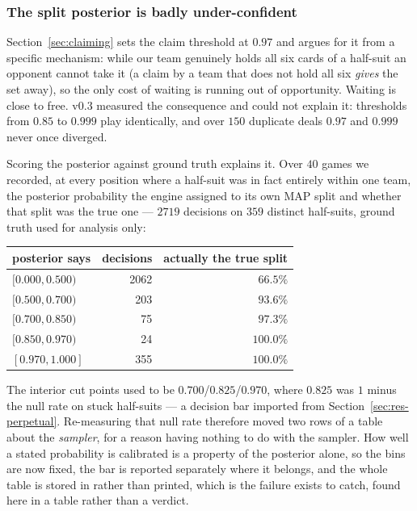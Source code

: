 \documentclass[11pt,letterpaper]{article}
\begin{document}
\subsubsection{The split posterior is badly under-confident}
\label{sec:res-splitcal}

Section~\ref{sec:claiming} sets the claim threshold at $0.97$ and argues for it
from a specific mechanism: while our team genuinely holds all six cards of a
half-suit an opponent cannot take it (a claim by a team that does not hold
all six \emph{gives} the set away), so the only cost of waiting is running out
of opportunity. Waiting is close to free. v0.3 measured the consequence and
could not explain it: thresholds from $0.85$ to $0.999$ play identically, and
over $150$ duplicate deals $0.97$ and $0.999$ never once diverged.

Scoring the posterior against ground truth explains it. Over $40$ games we
recorded, at every position where a half-suit was in fact entirely within one
team, the posterior probability the engine assigned to its own MAP split and
whether that split was the true one --- $2719$ decisions on $359$ distinct
half-suits, ground truth used for analysis only:
\begin{center}
\begin{tabular}{lrr}
\toprule
posterior says & decisions & actually the true split \\
\midrule
$[0.000, 0.500)$ & 2062 & $66.5\%$ \\
$[0.500, 0.700)$ & 203 & $93.6\%$ \\
$[0.700, 0.850)$ & 75 & $97.3\%$ \\
$[0.850, 0.970)$ & 24 & $100.0\%$ \\
$[0.970, 1.000]$ & 355 & $100.0\%$ \\
\bottomrule
\end{tabular}
\end{center}

The interior cut points used to be $0.700$/$0.825$/$0.970$, where $0.825$ was
$1$ minus the null rate on stuck half-suits --- a decision bar imported from
Section~\ref{sec:res-perpetual}. Re-measuring that null rate therefore moved
two rows of a table about the \emph{sampler}, for a reason having nothing to do
with the sampler. How well a stated probability is calibrated is a property of
the posterior alone, so the bins are now fixed, the bar is reported separately
where it belongs, and the whole table is stored in
 rather than printed, which is the
failure  exists to catch, found here in a
table rather than a verdict.
\end{document}
